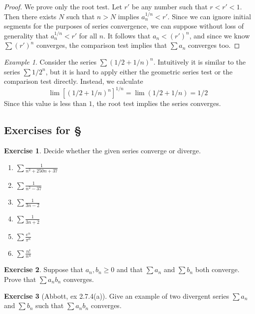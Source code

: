 \documentclass[11pt,oneside]{amsbook}
\theoremstyle{definition}
\newtheorem{exerc}{Exercise}[section]
\theoremstyle{plain}
\theoremstyle{definition}
\theoremstyle{remark}
\newtheorem{example}[theorem]{Example}
\numberwithin{equation}{section}
\numberwithin{figure}{section}
\begin{document}
\begin{proof}
  We prove only the root test. Let $r'$ be any number such that $r<r'<1$. Then there exists $N$ such that $n>N$ implies $a_n^{1/n}<r'$. Since we can ignore initial segments for the purposes of series convergence, we can suppose without loss of generality that $a_n^{1/n}<r'$ for all $n$. It follows that $a_n<(r')^n$, and since we know $\sum(r')^n$ converges, the comparison test implies that $\sum a_n$ converges too.
\end{proof}

\begin{example}
  Consider the series $\sum(1/2+1/n)^n$. Intuitively it is similar to the series $\sum1/2^n$, but it is hard to apply either the geometric series test or the comparison test directly. Instead, we calculate
  \[\lim[(1/2+1/n)^n]^{1/n}=\lim(1/2+1/n)=1/2
  \]
  Since this value is less than $1$, the root test implies the series converges.
\end{example}

\newpage
\subsection*{Exercises for \S \thesection}

\begin{exerc}
  Decide whether the given series converge or diverge.
  \begin{enumerate}
    \item $\displaystyle\sum\frac{1}{n^2+250n+37}$
    \item $\displaystyle\sum\frac{1}{n^2-37}$
    \item $\displaystyle\sum\frac{1}{3n-2}$
    \item $\displaystyle\sum\frac{1}{3n+2}$
    \item $\displaystyle\sum\frac{e^n}{\pi^n}$
    \item $\displaystyle\sum\frac{n!}{n^n}$
  \end{enumerate}
\end{exerc}

\begin{exerc}  
  Suppose that $a_n,b_n\geq0$ and that $\sum a_n$ and $\sum b_n$ both converge. Prove that $\sum a_nb_n$ converges.
\end{exerc}

\begin{exerc}[Abbott, ex 2.7.4(a)]
  Give an example of two divergent series $\sum a_n$ and $\sum b_n$ such that $\sum a_nb_n$ converges.
\end{exerc}
\end{document}
